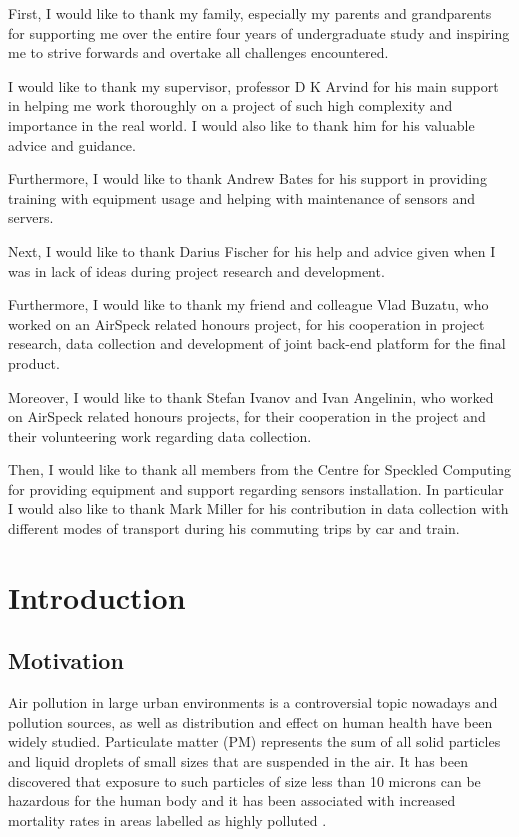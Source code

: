 \documentclass[bsc,frontabs,twoside,singlespacing, parskip,deptreport]{infthesis}     %
\begin{document}
First, I would like to thank my family, especially my parents and grandparents for supporting me over the entire four years of undergraduate study and inspiring me to strive forwards and overtake all challenges encountered.

I would like to thank my supervisor, professor D K Arvind for his main support in helping me work thoroughly on a project of such high complexity and importance in the real world. I would also like to thank him for his valuable advice and guidance.

Furthermore, I would like to thank Andrew Bates for his support in providing training with equipment usage and helping with maintenance of sensors and servers.

Next, I would like to thank Darius Fischer for his help and advice given when I was in lack of ideas during project research and development.

Furthermore, I would like to thank my friend and colleague Vlad Buzatu, who worked on an AirSpeck related honours project, for his cooperation in project research, data collection and development of joint back-end platform for the final product.

Moreover, I would like to thank Stefan Ivanov and Ivan Angelinin, who worked on AirSpeck related honours projects, for their cooperation in the project and their volunteering work regarding data collection.

Then, I would like to thank all members from the Centre for Speckled Computing for providing equipment and support regarding sensors installation. In particular I would also like to thank Mark Miller for his contribution in data collection with different modes of transport during his commuting trips by car and train.


\tableofcontents



\chapter{Introduction}

\section{Motivation}

Air pollution in large urban environments is a controversial topic nowadays and pollution sources, as well as distribution and effect on human health have been widely studied. Particulate matter (PM) represents the sum of all solid particles and liquid droplets of small sizes that are suspended in the air. It has been discovered that exposure to such particles of size less than 10 microns can be hazardous for the human body and it has been associated with increased mortality rates in areas labelled as highly polluted \cite{Dockery1994}.
\end{document}

